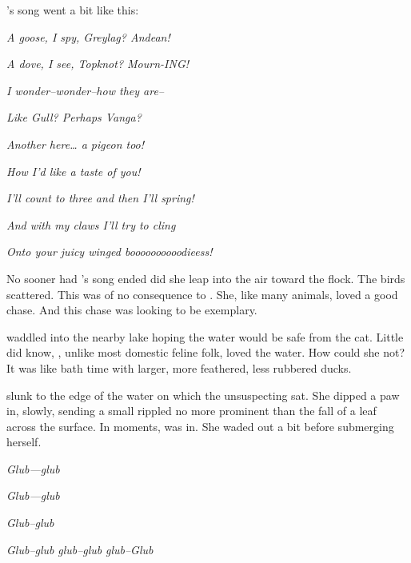 \doublenewpage
\noindent
\pixel's song went a bit like this:
\VV


\textit{A goose, I spy, Greylag? Andean!}


\textit{A dove, I see, Topknot? Mourn-ING!}
\VV


\textit{I wonder--wonder--how they are--}


\textit{Like Gull? Perhaps Vanga?}
\VV

\textit{Another here\ldots{} a pigeon too!}


\textit{How I'd like a taste of you!}
\VV


\textit{I'll count to three and then I'll spring!}


\textit{And with my claws I'll try to cling}


\textit{Onto your juicy winged boooooooooodieess!}
\VV


\noindent
No sooner had \pixel's song ended did she leap into the air toward the flock.
The birds scattered.
This was of no consequence to \pixel.  She, like many animals, loved a good chase.
And this chase was looking to be exemplary.
\VV


\noindent
\gooseF{} waddled into the nearby lake hoping the water would be safe
from the cat.  Little did \goose{} know, \pixel{}, unlike most domestic feline folk,
loved the water.  How could she not?  It was like bath time with larger,
more feathered, less rubbered ducks.
\VV


\noindent
\pixel{} slunk to the edge of the water on which the unsuspecting \goose{} sat.
She dipped a paw in, slowly, sending a small rippled no more prominent than
the fall of a leaf across the surface.  In moments, \pixel{} was in.
She waded out a bit before submerging herself.
\VV


\textit{\Large{}Glub\normalsize---\Large{}glub\normalsize}


\hspace*{14ex}\textit{\large{}Glub\normalsize---glub}


\hspace*{25.5ex}\textit{\large{}Glub\normalsize--glub}


\hspace*{36ex}\textit{Glub--glub}
\hspace{1ex}\textit{glub--glub}
\hspace{1ex}\textit{\large{}glub\normalsize--\LARGE{}Glub\normalsize}
\VV


